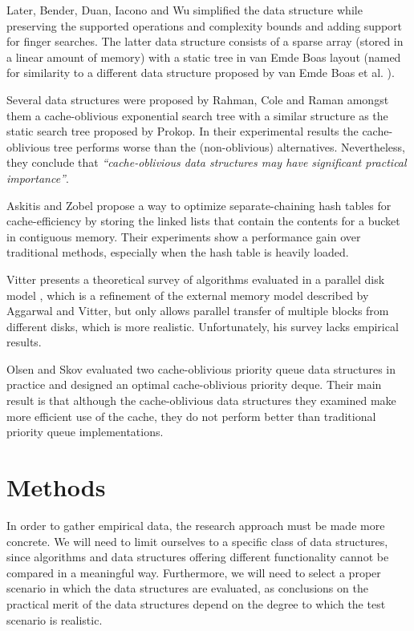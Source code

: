 \documentclass{acm_proc_article-sp}
\begin{document}
Later, Bender, Duan, Iacono and Wu simplified the data structure \cite{bender2004lpc} while preserving the supported operations and complexity bounds and adding support for finger searches. The latter data structure consists of a sparse array (stored in a linear amount of memory) with a static tree in van Emde Boas layout (named for similarity to a different data structure proposed by van Emde Boas et al. \cite{vanemdeboas1976dai}).

Several data structures were proposed by Rahman, Cole and Raman \cite{rahman2001opd} amongst them a cache-oblivious exponential search tree with a similar structure as the static search tree proposed by Prokop. In their experimental results the cache-oblivious tree performs worse than the (non-oblivious) alternatives. Nevertheless, they conclude that \textit{``cache-obli\-vious data structures may have significant practical importance''}.

Askitis and Zobel \cite{askitis2005ccc} propose a way to optimize separate-chaining hash tables for cache-efficiency by storing the linked lists that contain the contents for a bucket in contiguous memory. Their experiments show a performance gain over traditional methods, especially when the hash table is heavily loaded.

Vitter presents a theoretical survey of algorithms evaluated in a parallel disk model \cite{vitter2001ema}, which is a refinement of the external memory model described by Aggarwal and Vitter, but only allows parallel transfer of multiple blocks from different disks, which is more realistic. Unfortunately, his survey lacks empirical results.

Olsen and Skov evaluated two cache-oblivious priority queue data structures in practice \cite{olsen2002coa} and designed an optimal cache-obli\-vious priority deque. Their main result is that although the cache-obli\-vious data structures they examined make more efficient use of the cache, they do not perform better than traditional priority queue implementations.

\section{Methods}
In order to gather empirical data, the research approach must be made more concrete. We will need to limit ourselves to a specific class of data structures, since algorithms and data structures offering different functionality cannot be compared in a meaningful way. Furthermore, we will need to select a proper scenario in which the data structures are evaluated, as conclusions on the practical merit of the data structures depend on the degree to which the test scenario is realistic.
\end{document}
